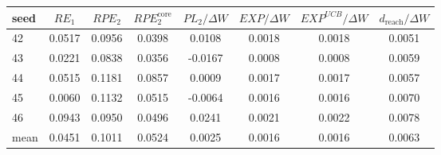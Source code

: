 \begin{tabular}{lccccccc}
\toprule
seed & $RE_1$ & $RPE_2$ & $RPE_2^{\text{core}}$ & $PL_2/\Delta W$ & $EXP/\Delta W$ & $EXP^{UCB}/\Delta W$ & $d_{\text{reach}}/\Delta W$ \\
\midrule
42 & 0.0517 & 0.0956 & 0.0398 & 0.0108 & 0.0018 & 0.0018 & 0.0051 \\
43 & 0.0221 & 0.0838 & 0.0356 & -0.0167 & 0.0008 & 0.0008 & 0.0059 \\
44 & 0.0515 & 0.1181 & 0.0857 & 0.0009 & 0.0017 & 0.0017 & 0.0057 \\
45 & 0.0060 & 0.1132 & 0.0515 & -0.0064 & 0.0016 & 0.0016 & 0.0070 \\
46 & 0.0943 & 0.0950 & 0.0496 & 0.0241 & 0.0021 & 0.0022 & 0.0078 \\
\midrule
mean & 0.0451 & 0.1011 & 0.0524 & 0.0025 & 0.0016 & 0.0016 & 0.0063 \\
\bottomrule
\end{tabular}
